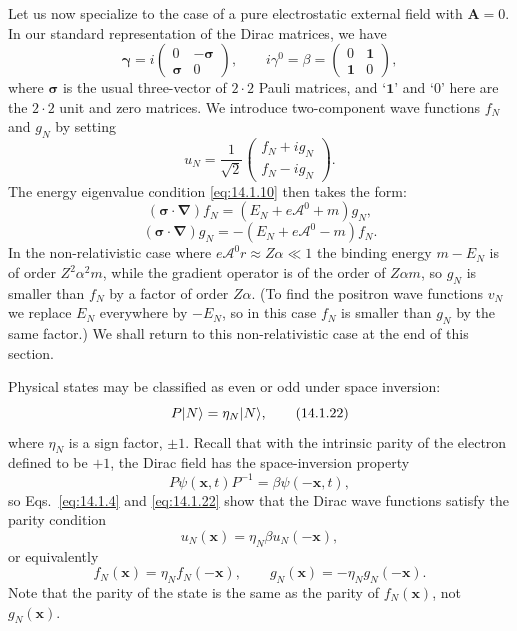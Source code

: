 Let us now specialize to the case of a pure electrostatic external field with
$\mathbf A=0$. In our standard representation of the Dirac matrices, we have
\[
  \boldsymbol\gamma=i\begin{pmatrix}0&-\boldsymbol\sigma\\
  \boldsymbol\sigma&0\end{pmatrix},\qquad
  i\gamma^0=\beta=\begin{pmatrix}0&\mathbf{1}\\\mathbf{1}&0\end{pmatrix},
\]
where $\boldsymbol\sigma$ is the usual three-vector of $2\cdot2$ Pauli
matrices, and `$\mathbf{1}$' and `$0$' here are the $2\cdot2$ unit and zero
matrices. We introduce two-component wave functions $f_N$ and $g_N$ by setting
\begin{equation}
  u_N=\frac1{\sqrt2}\begin{pmatrix}f_N+ig_N\\f_N-ig_N\end{pmatrix}.
  \tag{14.1.19}\label{eq:14.1.19}
\end{equation}
The energy eigenvalue condition \eqref{eq:14.1.10} then takes the form:
\begin{equation}
  (\boldsymbol\sigma\cdot\boldsymbol\nabla)f_N
  =(E_N+e\mathcal A^0+m)g_N,
  \tag{14.1.20}\label{eq:14.1.20}
\end{equation}
\begin{equation}
  (\boldsymbol\sigma\cdot\boldsymbol\nabla)g_N
  =-(E_N+e\mathcal A^0-m)f_N.
  \tag{14.1.21}\label{eq:14.1.21}
\end{equation}
In the non-relativistic case where $e\mathcal A^0r\approx Z\alpha\ll1$ the
binding energy $m-E_N$ is of order $Z^2\alpha^2m$, while the gradient operator
is of the order of $Z\alpha m$, so $g_N$ is smaller than $f_N$ by a factor of
order $Z\alpha$. (To find the positron wave functions $v_N$ we replace $E_N$
everywhere by $-E_N$, so in this case $f_N$ is smaller than $g_N$ by the same
factor.) We shall return to this non-relativistic case at the end of this
section.

Physical states may be classified as even or odd under space inversion:
\begin{equation}
  P\lvert N\rangle=\eta_N\lvert N\rangle,
  \tag{14.1.22}\label{eq:14.1.22}
\end{equation}
where $\eta_N$ is a sign factor, $\pm1$. Recall that with the intrinsic parity
of the electron defined to be $+1$, the Dirac field has the space-inversion
property
\[
  P\psi(\mathbf x,t)P^{-1}=\beta\psi(-\mathbf x,t),
\]
so Eqs.~\eqref{eq:14.1.4} and \eqref{eq:14.1.22} show that the Dirac wave
functions satisfy the parity condition
\begin{equation}
  u_N(\mathbf x)=\eta_N\beta u_N(-\mathbf x),
  \tag{14.1.23}\label{eq:14.1.23}
\end{equation}
or equivalently
\begin{equation}
  f_N(\mathbf x)=\eta_Nf_N(-\mathbf x),\qquad
  g_N(\mathbf x)=-\eta_Ng_N(-\mathbf x).
  \tag{14.1.24}\label{eq:14.1.24}
\end{equation}
Note that the parity of the state is the same as the parity of $f_N(\mathbf x)$,
not $g_N(\mathbf x)$.

